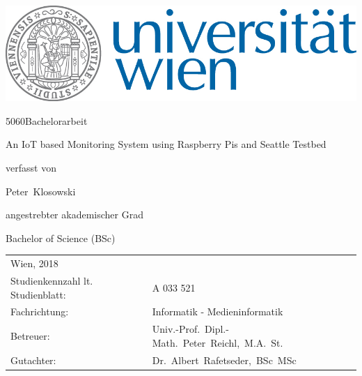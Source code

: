 \documentclass{article}      %
\makeatletter
\newcommand\HUGE{\@setfontsize\Huge{50}{60}}
\makeatother
\begin{document}

\thispagestyle{empty}
\begin{center}
\begin{minipage}{0.9\linewidth}
\flushright
	      		 
    \includegraphics[width=0.5\linewidth]{univie.jpg}\par
    \vspace{1.5cm}
\centering 	
	{\scshape{\HUGE Bachelorarbeit\par}}
	\vspace{1cm}
    {\scshape{\Large An IoT based Monitoring System using Raspberry Pis and Seattle Testbed\par}}
    \vspace{2cm}
    
  
 verfasst von \linebreak 
 {\Large Peter~Klosowski\par}
 	\vspace{1.3cm}
angestrebter akademischer Grad \linebreak
 {\Large Bachelor of Science (BSc)\par}
	\vspace{1.3cm}

\flushleft
	

\begin{tabular}{ll}
Wien, 2018	\linebreak
\vspace{1cm}&   \\
  Studienkennzahl lt. Studienblatt: & A 033 521 \vspace{0.3cm} \\ 
  Fachrichtung: & Informatik -  Medieninformatik \vspace{0.3cm} \\
  Betreuer: & Univ.-Prof.~Dipl.-Math.~Peter~Reichl,~M.A.~St. \\
  Gutachter: & Dr.~Albert~Rafetseder,~BSc~MSc \vspace{0.3cm} \\
 \end{tabular}
    
\end{minipage}
\end{center}
\clearpage
\end{document}
